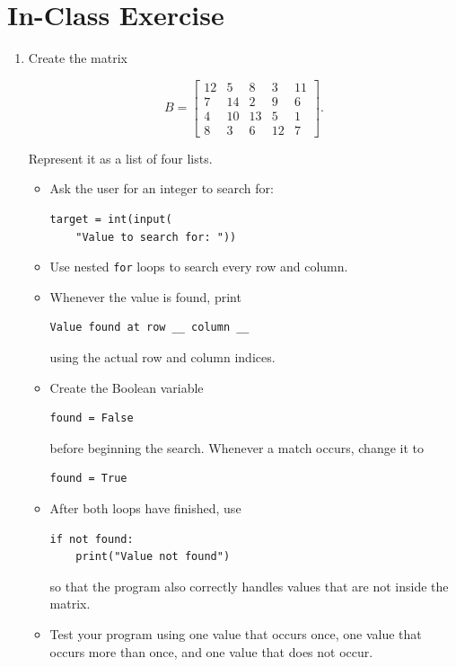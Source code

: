 \documentclass{article}
\begin{document}
\section{In-Class Exercise}

\begin{enumerate}

\item Create the matrix

\[
B =
\begin{bmatrix}
12 & 5 & 8 & 3 & 11 \\
7 & 14 & 2 & 9 & 6 \\
4 & 10 & 13 & 5 & 1 \\
8 & 3 & 6 & 12 & 7
\end{bmatrix}.
\]

Represent it as a list of four lists.

\begin{itemize}

\item Ask the user for an integer to search for:

\begin{verbatim}
target = int(input(
    "Value to search for: "))
\end{verbatim}

\item Use nested \texttt{for} loops to search every row and column.

\item Whenever the value is found, print

\begin{verbatim}
Value found at row __ column __
\end{verbatim}

using the actual row and column indices.

\item Create the Boolean variable

\begin{verbatim}
found = False
\end{verbatim}

before beginning the search. Whenever a match occurs, change it to

\begin{verbatim}
found = True
\end{verbatim}

\item After both loops have finished, use

\begin{verbatim}
if not found:
    print("Value not found")
\end{verbatim}

so that the program also correctly handles values that are not
inside the matrix.

\item Test your program using one value that occurs once, one value
that occurs more than once, and one value that does not occur.

\end{itemize}

\end{enumerate}
\end{document}
